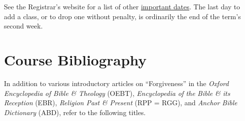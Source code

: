 \documentclass[titlepage]{article}
\begin{document}
See the Registrar's website for a list of other
\href{http://www.tyndale.ca/registrar/important-dates}{important dates}.
The last day to add a class, or to drop one without penalty, is
ordinarily the end of the term's second week.

\section{Course Bibliography}
\label{bibliography}

In addition to various introductory articles on ``Forgiveness'' in the
\emph{Oxford Encyclopedia of Bible \& Theology} (OEBT),
\emph{Encyclopedia of the Bible \& its Reception} (EBR), \emph {Religion
Past \& Present} (RPP = RGG), and \emph{Anchor Bible Dictionary} (ABD),
refer to the following titles.
\end{document}
